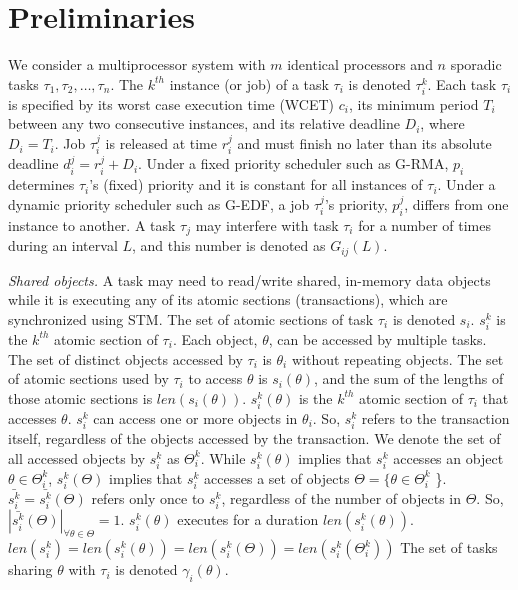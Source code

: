 \documentclass[conference,letterpaper]{IEEEtran}
\begin{document}
\section{Preliminaries}
\label{sec:model}

We consider a multiprocessor system with $m$ identical processors and $n$ sporadic tasks $\tau_1, \tau_2,\ldots, \tau_n$. The $k^{th}$ instance (or job) of a task $\tau_i$ is denoted $\tau_i^k$. Each task $\tau_i$ is specified by its worst case execution time (WCET) $c_i$, its minimum period $T_i$ between any two consecutive instances, and its relative deadline $D_i$, where $D_i=T_i$. Job $\tau_i^j$ is released at time $r_i^j$ and must finish no later than its absolute deadline $d_i^j=r_i^j+D_i$. Under a fixed priority scheduler such as G-RMA, $p_i$ determines $\tau_i$'s (fixed) priority and it is constant for all instances of $\tau_i$. Under a dynamic priority scheduler such as G-EDF, a job $\tau_i^j$'s priority, $p_i^j$, differs from one instance to another. 
A task $\tau_j$ may interfere with task $\tau_i$ for a number of times during an interval $L$, and this number is denoted as $G_{ij}(L)$. 


\textit{Shared objects.}
 A task may need to read/write shared, in-memory data objects while it is executing any of its atomic sections (transactions), which are synchronized using STM. 
The set of atomic sections of task $\tau_i$ is denoted $s_i$. $s_i^k$ is the $k^{th}$ atomic section of $\tau_i$. 
Each object, $\theta$, can be accessed by multiple tasks. The set of distinct objects accessed by $\tau_i$ is $\theta_i$ without repeating objects.
The set of atomic sections used by $\tau_i$ to access $\theta$ is $s_i(\theta)$, and the sum of the lengths of those atomic sections is $len(s_i(\theta))$. $s_i^k(\theta)$ is the $k^{th}$ atomic section of $\tau_i$ that accesses $\theta$.
%
 $s_i^k$ can access one or more objects in $\theta_i$. So, $s_i^k$ refers to the transaction itself, regardless of the objects accessed by the transaction. We denote the set of all accessed objects by $s_i^k$ as $\Theta_i^k$. While $s_i^k(\theta)$ implies that $s_i^k$ accesses an object $\theta \in \Theta_i^k$, $s_i^k(\Theta)$ implies that $s_i^k$ accesses a set of objects $\Theta=\{\theta \in \Theta_i^k$ \}. $\bar{s_i^k}=\bar{s_i^k}(\Theta)$ refers only once to $s_i^k$, regardless of the number of objects in $\Theta$. So, $|\bar{s_i^k}(\Theta)|_{\forall \theta \in \Theta}=1$.
%
 $s_i^k(\theta)$  executes for a duration $len(s_i^k(\theta))$. $len(s_i^k)=len(s_i^k(\theta))=len(s_i^k(\Theta))=len(s_i^k(\Theta_i^k))$ The set of tasks sharing $\theta$ with $\tau_i$ is denoted $\gamma_i(\theta)$. 
\end{document}
